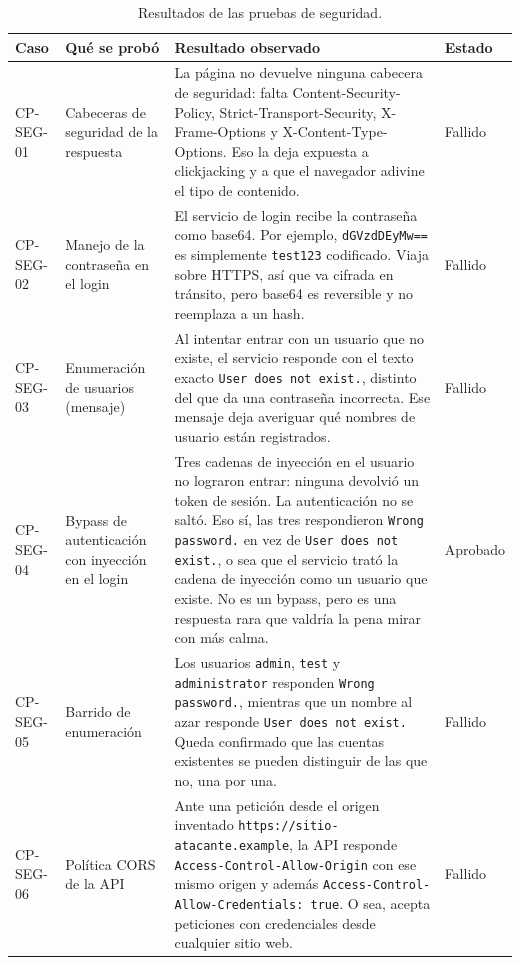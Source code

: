 \documentclass[11pt,a4paper]{article}
\begin{document}
\begingroup
\footnotesize
\setlength{\tabcolsep}{4pt}
\renewcommand{\arraystretch}{1.2}
\begin{table}[htb]\centering\footnotesize
\caption{Resultados de las pruebas de seguridad.}
\begin{tabularx}{\textwidth}{@{}L{1.6cm} L{3.1cm} Y L{1.6cm}@{}}
\toprule
\textbf{Caso} & \textbf{Qué se probó} & \textbf{Resultado observado} & \textbf{Estado} \\
\midrule
CP-SEG-01 & Cabeceras de seguridad de la respuesta & La página no devuelve ninguna cabecera de seguridad: falta Content-Security-Policy, Strict-Transport-Security, X-Frame-Options y X-Content-Type-Options. Eso la deja expuesta a clickjacking y a que el navegador adivine el tipo de contenido. & Fallido \\
CP-SEG-02 & Manejo de la contraseña en el login & El servicio de login recibe la contraseña como base64. Por ejemplo, \texttt{dGVzdDEyMw==} es simplemente \texttt{test123} codificado. Viaja sobre HTTPS, así que va cifrada en tránsito, pero base64 es reversible y no reemplaza a un hash. & Fallido \\
CP-SEG-03 & Enumeración de usuarios (mensaje) & Al intentar entrar con un usuario que no existe, el servicio responde con el texto exacto \texttt{User does not exist.}, distinto del que da una contraseña incorrecta. Ese mensaje deja averiguar qué nombres de usuario están registrados. & Fallido \\
CP-SEG-04 & Bypass de autenticación con inyección en el login & Tres cadenas de inyección en el usuario no lograron entrar: ninguna devolvió un token de sesión. La autenticación no se saltó. Eso sí, las tres respondieron \texttt{Wrong password.} en vez de \texttt{User does not exist.}, o sea que el servicio trató la cadena de inyección como un usuario que existe. No es un bypass, pero es una respuesta rara que valdría la pena mirar con más calma. & Aprobado \\
CP-SEG-05 & Barrido de enumeración & Los usuarios \texttt{admin}, \texttt{test} y \texttt{administrator} responden \texttt{Wrong password.}, mientras que un nombre al azar responde \texttt{User does not exist.} Queda confirmado que las cuentas existentes se pueden distinguir de las que no, una por una. & Fallido \\
CP-SEG-06 & Política CORS de la API & Ante una petición desde el origen inventado \texttt{https://sitio-atacante.example}, la API responde \texttt{Access-Control-Allow-Origin} con ese mismo origen y además \texttt{Access-Control-Allow-Credentials: true}. O sea, acepta peticiones con credenciales desde cualquier sitio web. & Fallido \\
\bottomrule
\end{tabularx}
\end{table}
\endgroup
\end{document}
